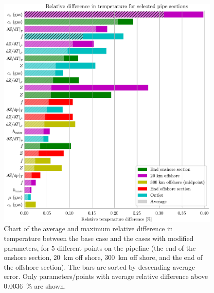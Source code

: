 \begin{figure}[!p]%
    \centering%
    \includegraphics{figures/barchart_all_temperature_absolute.pdf}%
    \caption{%
        Chart of the average and maximum relative difference in temperature between the base case and the cases with modified parameters, for 5 different points on the pipeline (the end of the onshore section, \SI{20}{\kilo\meter} off shore, \SI{300}{\kilo\meter} off shore, and the end of the offshore section). The bars are sorted by descending average error. 
        Only parameters/points with average relative difference above \SI{0.0036}{\percent} are shown.%
        \label{fig:temperatureBarChart}%
    }%
\end{figure}%


